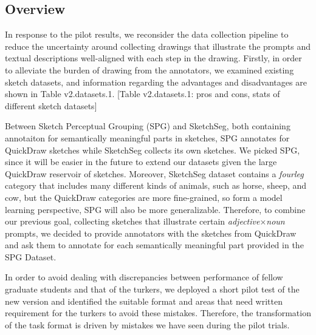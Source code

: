 
\subsection{Overview}
In response to the pilot results, we reconsider the data collection pipeline to reduce the uncertainty around collecting drawings that illustrate the prompts and textual descriptions well-aligned with each step in the drawing. Firstly, in order to alleviate the burden of drawing from the annotators, we examined existing sketch datasets, and information regarding the advantages and disadvantages are shown in Table v2.datasets.1.   
[Table v2.datasets.1: pros and cons, stats of different sketch datasets]

Between Sketch Perceptual Grouping (SPG) and SketchSeg, both containing annotaiton for semantically meaningful parts in sketches, SPG annotates for QuickDraw sketches while SketchSeg collects its own sketches. We picked SPG, since it will be easier in the future to extend our datasets given the large QuickDraw reservoir of sketches. Moreover, SketchSeg dataset contains a \textit{fourleg} category that includes many different kinds of animals, such as horse, sheep, and cow, but the QuickDraw categories are more fine-grained, so form a model learning perspective, SPG will also be more generalizable. Therefore, to combine our previous goal, collecting sketches that illustrate certain \textit{adjective}$\times$\textit{noun} prompts, we decided to provide annotators with the sketches from QuickDraw and ask them to annotate for each semantically meaningful part provided in the SPG Dataset. 

In order to avoid dealing with discrepancies between performance of fellow graduate students and that of the turkers, we deployed a short pilot test of the new version and identified the suitable format and areas that need written requirement for the turkers to avoid these mistakes.   
Therefore, the transformation of the task format is driven by mistakes we have seen during the pilot trials. 

